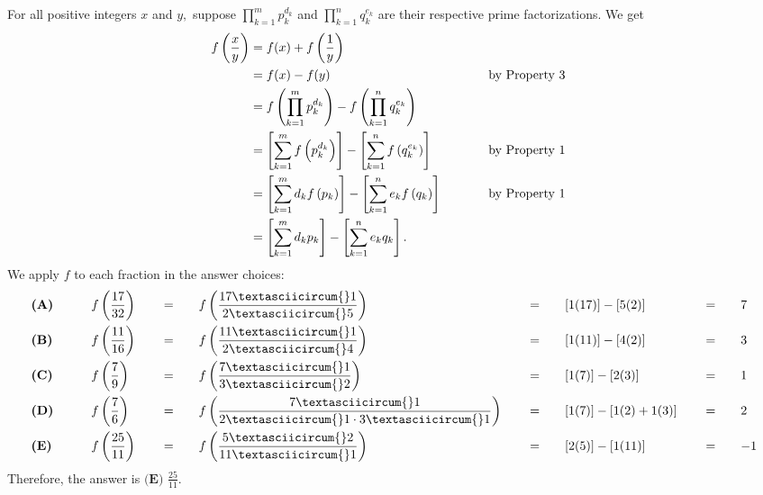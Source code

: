 \begin{enumerate}
\begin{enumerate}
            \end{enumerate}
            For all positive integers $x$ and $y,$ suppose $\prod_{k=1}^{m}p_k^{d_k}$ and $\prod_{k=1}^{n}q_k^{e_k}$ are their respective prime factorizations. We get
 \begin{align*} f\left(\frac xy\right)&=f(x)+f\left(\frac 1y\right) \\ &=f(x)-f(y) && \hspace{10mm}\text{by Property 3} \\ &=f\left(\prod_{k=1}^{m}p_k^{d_k}\right)-f\left(\prod_{k=1}^{n}q_k^{e_k}\right) \\ &=\left[\sum_{k=1}^{m}f\left(p_k^{d_k}\right)\right]-\left[\sum_{k=1}^{n}f\left(q_k^{e_k}\right)\right] && \hspace{10mm}\text{by Property 1} \\ &=\left[\sum_{k=1}^{m}d_k f\left(p_k\right)\right]-\left[\sum_{k=1}^{n}e_k f\left(q_k\right)\right] && \hspace{10mm}\text{by Property 1} \\ &=\left[\sum_{k=1}^{m}d_k p_k \right]-\left[\sum_{k=1}^{n}e_k q_k \right]. \end{align*}
We apply $f$ to each fraction in the answer choices:
 \begin{alignat*}{10} &\textbf{(A)} \qquad && f\left(\frac{17}{32}\right) \quad && = \quad && f\left(\frac{17\textasciicircum{}1}{2\textasciicircum{}5}\right) \quad && = \quad && [1(17)]-[5(2)] \quad && = \quad && 7 \\  &\textbf{(B)} \qquad && f\left(\frac{11}{16}\right) \quad && = \quad && f\left(\frac{11\textasciicircum{}1}{2\textasciicircum{}4}\right) \quad && = \quad && [1(11)]-[4(2)] \quad && = \quad && 3 \\  &\textbf{(C)} \qquad && f\left(\frac{7}{9}\right) \quad && = \quad && f\left(\frac{7\textasciicircum{}1}{3\textasciicircum{}2}\right)  \quad && = \quad && [1(7)]-[2(3)]  \quad && = \quad && 1 \\  &\textbf{(D)} \qquad && f\left(\frac{7}{6}\right) \quad && = \quad && f\left(\frac{7\textasciicircum{}1}{2\textasciicircum{}1\cdot3\textasciicircum{}1}\right) \quad && = \quad && [1(7)]-[1(2)+1(3)] \quad && = \quad && 2 \\ &\textbf{(E)} \qquad && f\left(\frac{25}{11}\right) \quad && = \quad && f\left(\frac{5\textasciicircum{}2}{11\textasciicircum{}1}\right) \quad && = \quad && [2(5)]-[1(11)] \quad && = \quad && {-}1 \end{alignat*}Therefore, the answer is $\boxed{\textbf{(E) }\frac{25}{11}}.$





\end{enumerate}
